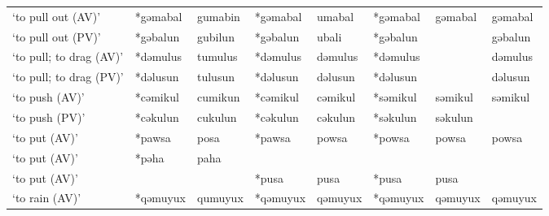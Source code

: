 \begin{landscape}
\begin{longtable}[c]{@{}p{3cm}<{\raggedright}p{2.75cm}<{\raggedright}p{2.75cm}<{\raggedright}p{2.75cm}<{\raggedright}p{2.75cm}<{\raggedright}p{2.75cm}<{\raggedright}p{2.75cm}<{\raggedright}p{2.75cm}<{\raggedright}@{}}
`to pull out (AV)'                                   & *gəmabal     & gumabin                       & *gəmabal       & umabal                     & *gəmabal         & gəmabal                  & gəmabal                           \\
`to pull out (PV)'                                   & *gəbalun     & gubilun                       & *gəbalun       & ubali                      & *gəbalun         &                          & gəbalun                           \\
`to pull; to drag (AV)'                              & *dəmulus     & tumulus                       & *dəmulus       & dəmulus                    & *dəmulus         &                          & dəmulus                           \\
`to pull; to drag (PV)'                              & *dəlusun     & tulusun                       & *dəlusun       & dəlusun                    & *dəlusun         &                          & dəlusun                           \\
`to push (AV)'                                       & *cəmikul     & cumikun                       & *cəmikul       & cəmikul                    & *səmikul         & səmikul                  & səmikul                           \\
`to push (PV)'                                       & *cəkulun     & cukulun                       & *cəkulun       & cəkulun                    & *səkulun         & səkulun                  &                                   \\
`to put (AV)'                                        & *pawsa       & posa                          & *pawsa         & powsa                      & *powsa           & powsa                    & powsa                             \\
`to put (AV)'                                        & *pəha        & paha                          &                &                            &                  &                          &                                   \\
`to put (AV)'                                        &              &                               & *pusa          & pusa                       & *pusa            & pusa                     &                                   \\
`to rain (AV)'                                       & *qəmuyux     & qumuyux                       & *qəmuyux       & qəmuyux                    & *qəmuyux         & qəmuyux                  & qəmuyux                           \\

\end{longtable}
\end{landscape}
